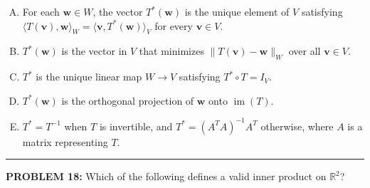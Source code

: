 \documentclass[12pt]{amsart}
\newcommand{\divider}{
  \vspace{-1em} %
  \noindent
  \raisebox{-0.15ex}{\textbullet}%
  \hspace{0.5em}%
  \rule[0.5ex]{0.95\textwidth}{1.0pt}%
  \hspace{0.5em}%
  \raisebox{-0.15ex}{\textbullet}%
  \vspace{0em} %
}
\begin{document}
\begin{enumerate}[(A)]
\item For each $\mathbf{w} \in W$, the vector $T^*(\mathbf{w})$ is the unique element of $V$ satisfying \\ $\langle T(\mathbf{v}), \mathbf{w} \rangle_W = \langle \mathbf{v}, T^*(\mathbf{w}) \rangle_V$ for every $\mathbf{v} \in V$.
\item $T^*(\mathbf{w})$ is the vector in $V$ that minimizes $\|T(\mathbf{v}) - \mathbf{w}\|_W$ over all $\mathbf{v} \in V$.
\item $T^*$ is the unique linear map $W \to V$ satisfying $T^* \circ T = I_V$.
\item $T^*(\mathbf{w})$ is the orthogonal projection of $\mathbf{w}$ onto $\operatorname{im}(T)$.
\item $T^* = T^{-1}$ when $T$ is invertible, and $T^* = (A^TA)^{-1}A^T$ otherwise, where $A$ is a matrix representing $T$.
\end{enumerate}


\divider



{\bf PROBLEM 18:}
%
Which of the following defines a valid inner product on $\mathbb{R}^2$?
\end{document}
